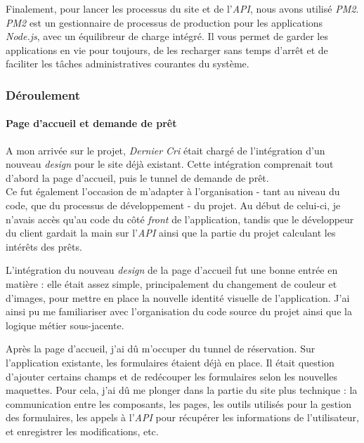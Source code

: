 Finalement, pour lancer les processus du site et de l'\emph{API}, nous
avons utilisé \emph{PM2}. \emph{PM2} est un gestionnaire de processus de
production pour les applications \emph{Node.js}, avec un équilibreur de
charge intégré. Il vous permet de garder les applications en vie pour
toujours, de les recharger sans temps d'arrêt et de faciliter les tâches
administratives courantes du système.

\bigskip

\subsubsection{Déroulement}\label{duxe9roulement-1}

\paragraph{Page d'accueil et demande de
prêt}\label{page-daccueil-et-demande-de-pruxeat}

\bigskip

A mon arrivée sur le projet, \emph{Dernier Cri} était chargé de
l'intégration d'un nouveau \emph{design} pour le site déjà existant.
Cette intégration comprenait tout d'abord la page d'accueil, puis le
tunnel de demande de prêt.\\
Ce fut également l'occasion de m'adapter à l'organisation - tant au
niveau du code, que du processus de développement - du projet. Au début
de celui-ci, je n'avais accès qu'au code du côté \emph{front} de
l'application, tandis que le développeur du client gardait la main sur
l'\emph{API} ainsi que la partie du projet calculant les intérêts des
prêts.

\bigskip

L'intégration du nouveau \emph{design} de la page d'accueil fut une
bonne entrée en matière : elle était assez simple, principalement du
changement de couleur et d'images, pour mettre en place la nouvelle
identité visuelle de l'application. J'ai ainsi pu me familiariser avec
l'organisation du code source du projet ainsi que la logique métier
sous-jacente.

\bigskip

Après la page d'accueil, j'ai dû m'occuper du tunnel de réservation. Sur
l'application existante, les formulaires étaient déjà en place. Il était
question d'ajouter certains champs et de redécouper les formulaires
selon les nouvelles maquettes. Pour cela, j'ai dû me plonger dans la
partie du site plus technique : la communication entre les composants,
les pages, les outils utilisés pour la gestion des formulaires, les
appels à l'\emph{API} pour récupérer les informations de l'utilisateur,
et enregistrer les modifications, etc.

